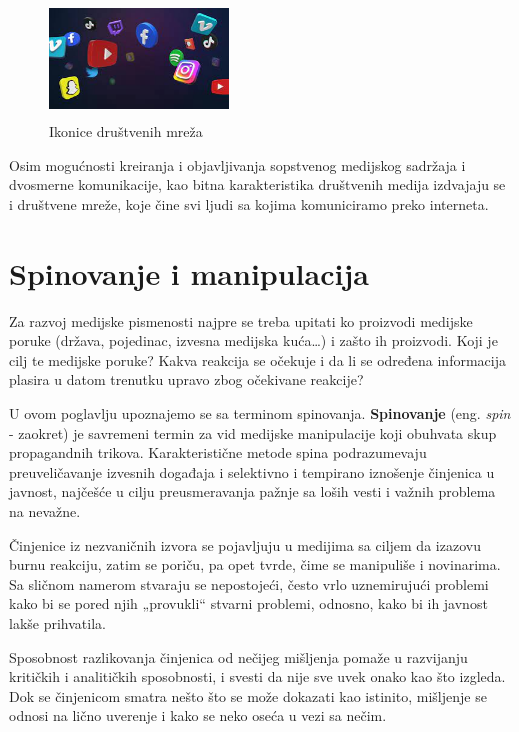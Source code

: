 \documentclass[a4paper]{article}
\begin{document}
	\begin{figure}[h!]
	\begin{center}
		\includegraphics[width=1.87842in,height=1.225in]{slika4.jpg}
	\end{center}
	\label{fig:icons}
	\caption {Ikonice društvenih mreža}
	
\end{figure}
	
	Osim mogućnosti kreiranja i objavljivanja sopstvenog medijskog sadržaja i dvosmerne komunikacije, kao bitna karakteristika društvenih medija izdvajaju se i društvene mreže, koje čine svi ljudi sa kojima komuniciramo preko interneta. 


\section{Spinovanje i manipulacija}
\label{sec:naslovN}

Za razvoj medijske pismenosti najpre se treba upitati ko proizvodi medijske poruke (država, pojedinac, izvesna medijska kuća…) i zašto ih proizvodi. Koji je cilj te medijske poruke? Kakva reakcija se očekuje i da li se određena informacija plasira u datom trenutku upravo zbog očekivane reakcije? 

U ovom poglavlju upoznajemo se sa terminom spinovanja. \textbf{Spinovanje} (eng. \emph{spin} - zaokret) je savremeni termin za vid medijske manipulacije koji obuhvata skup propagandnih trikova. Karakteristične metode spina podrazumevaju preuveličavanje izvesnih događaja i selektivno i tempirano iznošenje činjenica u javnost, najčešće u cilju preusmeravanja pažnje sa loših vesti i važnih problema na nevažne.

Činjenice iz nezvaničnih izvora se pojavljuju u medijima sa ciljem da izazovu burnu reakciju, zatim se poriču, pa opet tvrde, čime se manipuliše i novinarima. Sa sličnom namerom stvaraju se nepostojeći, često vrlo uznemirujući problemi kako bi se pored njih „provukli“ stvarni problemi, odnosno, kako bi ih javnost lakše prihvatila. 

Sposobnost razlikovanja činjenica od nečijeg mišljenja pomaže u razvijanju kritičkih i analitičkih sposobnosti, i svesti da nije sve uvek onako kao što izgleda. Dok se činjenicom smatra nešto što se može dokazati kao istinito, mišljenje se odnosi na lično uverenje i kako se neko oseća u vezi sa nečim. 
\end{document}

